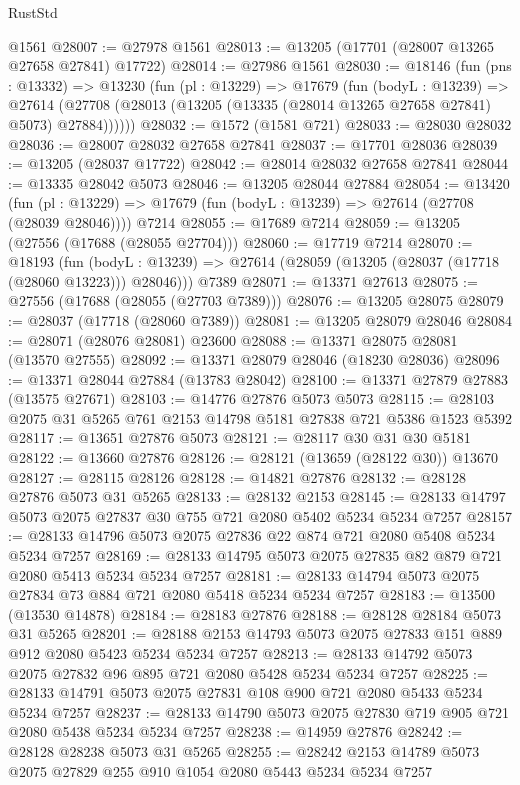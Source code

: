 \begin{lexlean}{RustStd}
\begin{coremodule}
    @1561
@28007 := @27978 @1561
@28013 := @13205 (@17701 (@28007 @13265 @27658 @27841) @17722)
@28014 := @27986 @1561
@28030 := @18146
    (fun (pns : @13332) =>
    @13230
      (fun (pl : @13229) =>
      @17679
        (fun (bodyL : @13239) =>
        @27614 (@27708 (@28013 (@13205 (@13335 (@28014 @13265 @27658 @27841) @5073) @27884))))))
@28032 := @1572 (@1581 @721)
@28033 := @28030 @28032
@28036 := @28007 @28032 @27658 @27841
@28037 := @17701 @28036
@28039 := @13205 (@28037 @17722)
@28042 := @28014 @28032 @27658 @27841
@28044 := @13335 @28042 @5073
@28046 := @13205 @28044 @27884
@28054 := @13420
    (fun (pl : @13229) => @17679 (fun (bodyL : @13239) => @27614 (@27708 (@28039 @28046))))
    @7214
@28055 := @17689 @7214
@28059 := @13205 (@27556 (@17688 (@28055 @27704)))
@28060 := @17719 @7214
@28070 := @18193
    (fun (bodyL : @13239) => @27614 (@28059 (@13205 (@28037 (@17718 (@28060 @13223))) @28046)))
    @7389
@28071 := @13371 @27613
@28075 := @27556 (@17688 (@28055 (@27703 @7389)))
@28076 := @13205 @28075
@28079 := @28037 (@17718 (@28060 @7389))
@28081 := @13205 @28079 @28046
@28084 := @28071 (@28076 @28081) @23600
@28088 := @13371 @28075 @28081 (@13570 @27555)
@28092 := @13371 @28079 @28046 (@18230 @28036)
@28096 := @13371 @28044 @27884 (@13783 @28042)
@28100 := @13371 @27879 @27883 (@13575 @27671)
@28103 := @14776 @27876 @5073 @5073
@28115 := @28103 @2075 @31 @5265 @761 @2153 @14798 @5181 @27838 @721 @5386 @1523 @5392
@28117 := @13651 @27876 @5073
@28121 := @28117 @30 @31 @30 @5181
@28122 := @13660 @27876
@28126 := @28121 (@13659 (@28122 @30)) @13670
@28127 := @28115 @28126
@28128 := @14821 @27876
@28132 := @28128 @27876 @5073 @31 @5265
@28133 := @28132 @2153
@28145 := @28133 @14797 @5073 @2075 @27837 @30 @755 @721 @2080 @5402 @5234 @5234 @7257
@28157 := @28133 @14796 @5073 @2075 @27836 @22 @874 @721 @2080 @5408 @5234 @5234 @7257
@28169 := @28133 @14795 @5073 @2075 @27835 @82 @879 @721 @2080 @5413 @5234 @5234 @7257
@28181 := @28133 @14794 @5073 @2075 @27834 @73 @884 @721 @2080 @5418 @5234 @5234 @7257
@28183 := @13500 (@13530 @14878)
@28184 := @28183 @27876
@28188 := @28128 @28184 @5073 @31 @5265
@28201 := @28188 @2153 @14793 @5073 @2075 @27833 @151 @889 @912 @2080 @5423 @5234 @5234 @7257
@28213 := @28133 @14792 @5073 @2075 @27832 @96 @895 @721 @2080 @5428 @5234 @5234 @7257
@28225 := @28133 @14791 @5073 @2075 @27831 @108 @900 @721 @2080 @5433 @5234 @5234 @7257
@28237 := @28133 @14790 @5073 @2075 @27830 @719 @905 @721 @2080 @5438 @5234 @5234 @7257
@28238 := @14959 @27876
@28242 := @28128 @28238 @5073 @31 @5265
@28255 := @28242 @2153 @14789 @5073 @2075 @27829 @255 @910 @1054 @2080 @5443 @5234 @5234 @7257

\end{coremodule}
\end{lexlean}

